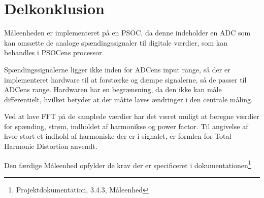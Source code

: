 
\section{Delkonklusion}

Måleenheden er implementeret på en PSOC, da denne indeholder en ADC som kan omsætte de analoge spændingssignaler til digitale værdier, som kan behandles i PSOCens processor. 

Spændingssignalerne ligger ikke inden for ADCens input range, så der er implementeret hardware til at forstærke og dæmpe signalerne, så de passer til ADCens range. Hardwaren har en begrænsning, da den ikke kan måle differentielt, hvilket betyder at der måtte laves ændringer i den centrale måling. 

Ved at lave FFT på de samplede værdier har det været muligt at beregne værdier for spænding, strøm, indholdet af harmonikse og power factor. Til angivelse af hvor stort et indhold af harmoniske der er i signalet, er formlen for Total Harmonic Distortion anvendt.

Den færdige Måleenhed opfylder de krav der er specificeret i dokumentationen\footnote{Projektdokumentation, 3.4.3, Måleenhed}

